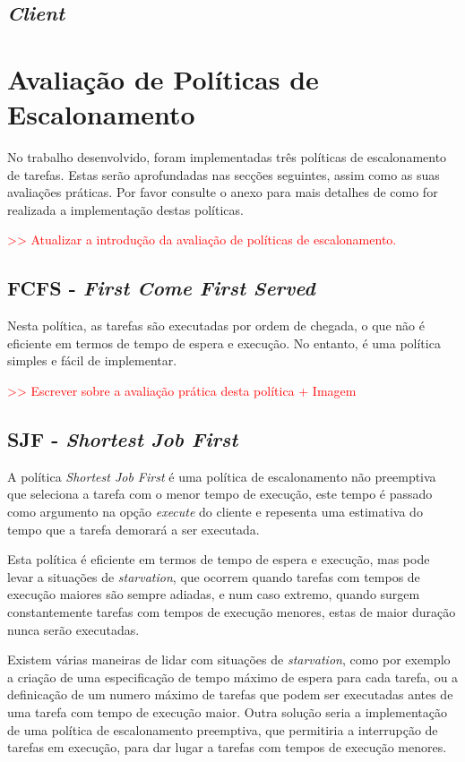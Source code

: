 \documentclass[a4paper,11pt]{scrreprt}
\begin{document}
    \section{\textit{Client}}

\chapter{Avaliação de Políticas de Escalonamento}
    No trabalho desenvolvido, foram implementadas três políticas de escalonamento de tarefas.
    Estas serão aprofundadas nas secções seguintes, assim como as suas avaliações práticas.
    Por favor consulte o anexo  para mais detalhes de como for realizada
    a implementação destas políticas.

    \textcolor{red}{>> Atualizar a introdução da avaliação de políticas de escalonamento.}
    \section{\textbf{FCFS} - \textit{First Come First Served}}
        Nesta política, as tarefas são executadas por ordem de chegada, o que não é
        eficiente em termos de tempo de espera e execução. No entanto, é uma política
        simples e fácil de implementar.

        \textcolor{red}{>> Escrever sobre a avaliação prática desta política + Imagem}
    \section{\textbf{SJF} - \textit{Shortest Job First}}
        A política \textit{Shortest Job First} é uma política de escalonamento não preemptiva
        que seleciona a tarefa com o menor tempo de execução, este tempo é passado como
        argumento na opção \textit{execute} do cliente e repesenta uma estimativa do tempo
        que a tarefa demorará a ser executada.

        Esta política é eficiente em termos de tempo de espera e execução, mas pode levar
        a situações de \textit{starvation}, que ocorrem quando tarefas com tempos de execução
        maiores são sempre adiadas, e num caso extremo, quando surgem constantemente tarefas
        com tempos de execução menores, estas de maior duração nunca serão executadas.

        Existem várias maneiras de lidar com situações de \textit{starvation}, como por exemplo
        a criação de uma especificação de tempo máximo de espera para cada tarefa, ou a
        definicação de um numero máximo de tarefas que podem ser executadas antes de uma
        tarefa com tempo de execução maior. Outra solução seria a implementação de uma
        política de escalonamento preemptiva, que permitiria a interrupção de tarefas em
        execução, para dar lugar a tarefas com tempos de execução menores.
\end{document}
